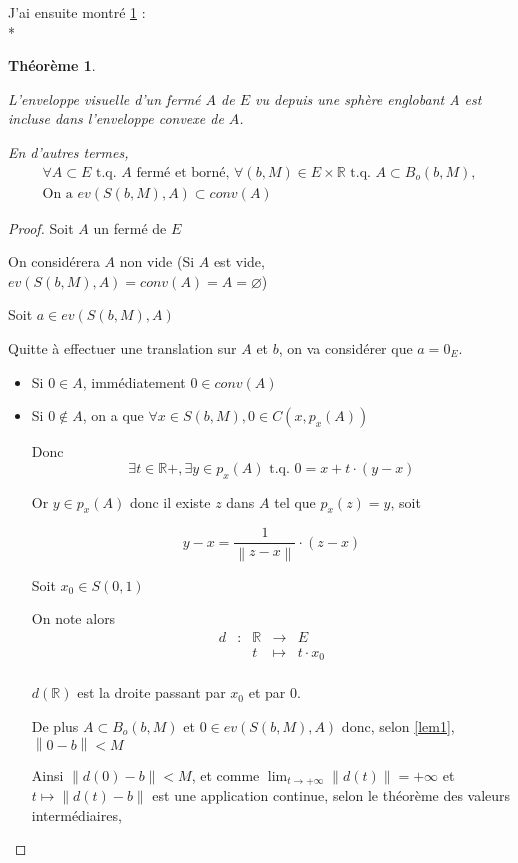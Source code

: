 \documentclass[a4paper]{article}
\newcommand{\norm}[1]{\left\lVert#1\right\rVert}
\newtheorem{theo}{Théorème}
\begin{document}
\bigskip

J'ai ensuite montré \ref{th1} :\\*
\begin{theo}\label{th1}

L'enveloppe visuelle d'un fermé $A$ de $E$ vu depuis une sphère englobant A est incluse dans l'enveloppe convexe de $A$.

En d'autres termes, 
\begin{gather*}
\forall A \subset E \text{ t.q. $A$ fermé et borné, } \forall (b, M) \in E \times \mathbb{R} \text{ t.q. } A \subset B_{o}(b, M), \\
\text{On a } ev(S(b, M), A) \subset conv(A)
\end{gather*}
\end{theo}


\begin{proof}
Soit $A$ un fermé de $E$

On considérera $A$ non vide (Si $A$ est vide, $ev(S(b, M), A) = conv(A) = A = \varnothing$)

Soit $a \in ev(S(b, M), A)$

Quitte à effectuer une translation sur $A$ et $b$, on va considérer que $a = 0_{E}$.

\begin{itemize}
\item Si $0 \in A$, immédiatement $0 \in conv(A)$
\bigskip
\item Si $0 \notin A$, on a que $\forall x \in S(b, M), 0 \in C(x, p_{x}(A))$

Donc \[\exists t \in \mathbb{R}+, \exists y\in p_{x}(A) \text{ t.q. } 0 = x + t \cdot (y - x)\]

Or $y \in p_{x}(A)$ donc il existe $z$ dans $A$ tel que $p_{x}(z) = y$, soit

\[y - x = \frac{1}{\norm{z - x}} \cdot (z - x)\]


Soit $x_{0} \in S(0, 1)$

On note alors
\[\begin{array}{ccccl}
d& : & \mathbb{R} & \to & E \\
 & & t & \mapsto & t \cdot x_{0} \\
\end{array}\]

$d(\mathbb{R})$ est la droite passant par $x_{0}$  et par $0$.

De plus $A \subset B_{o}(b, M)$ et $0 \in ev(S(b, M), A)$ donc, selon \ref{lem1}, $\norm{0 - b} < M$

Ainsi $\norm{d(0) - b} < M$, et comme $\lim_{t \to +\infty}\norm{d(t)} = +\infty$ et $t \mapsto \norm{d(t) - b}$ est une application continue, selon le théorème des valeurs intermédiaires,


\end{itemize}
\end{proof}
\end{document}
